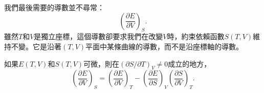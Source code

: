 我們最後需要的導數並不尋常：
\[
 \left(\frac{\partial E}{\partial V}\right)_S.
\]
雖然\(T\)和\(V\)是獨立座標，這個導數卻要求我們在改變\(V\)時，約束依賴函數\(S(T,V)\)維持不變。它是沿著\((T,V)\)平面中某條曲線的導數，而不是沿座標軸的導數。

\begin{classroomqa}
\end{classroomqa}

\begin{lemma}
如果\(E(T,V)\)和\(S(T,V)\)可微，則在\((\partial S/\partial T)_V\neq0\)成立的地方，
\begin{equation}
 \left(\frac{\partial E}{\partial V}\right)_S
 =
 \left(\frac{\partial E}{\partial V}\right)_T
 -
 \left(\frac{\partial E}{\partial S}\right)_V
 \left(\frac{\partial S}{\partial V}\right)_T.
 \label{eq:sm5-calculus-lemma}
\end{equation}
\end{lemma}

